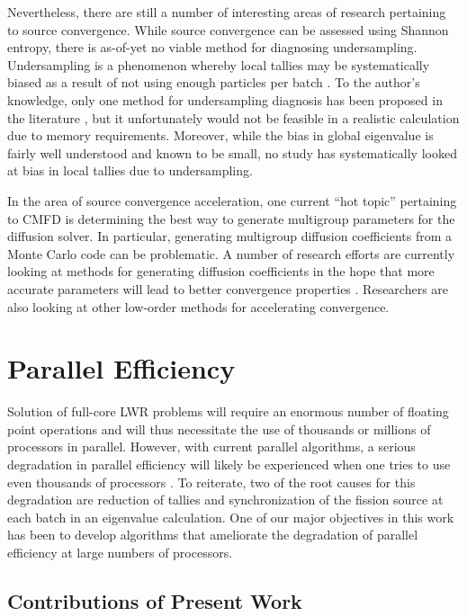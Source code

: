 Nevertheless, there are still a number of interesting areas of research
pertaining to source convergence. While source convergence can be assessed using
Shannon entropy, there is as-of-yet no viable method for diagnosing
undersampling. Undersampling is a phenomenon whereby local tallies may be
systematically biased as a result of not using enough particles per batch
\cite{nse-ueki-2005, nse-ueki-2008}. To the author's knowledge, only one method
for undersampling diagnosis has been proposed in the literature
\cite{jnst-ueki-2011}, but it unfortunately would not be feasible in a realistic
calculation due to memory requirements. Moreover, while the bias in global
eigenvalue is fairly well understood \cite{ane-brissenden-1986} and known to be
small, no study has systematically looked at bias in local tallies due to
undersampling.

In the area of source convergence acceleration, one current ``hot topic''
pertaining to CMFD is determining the best way to generate multigroup parameters
for the diffusion solver. In particular, generating multigroup diffusion
coefficients from a Monte Carlo code can be problematic. A number of research
efforts are currently looking at methods for generating diffusion coefficients
in the hope that more accurate parameters will lead to better convergence
properties \cite{ane-fridman-2011, nse-pounders-2009}. Researchers are also
looking at other low-order methods for accelerating convergence.

\section{Parallel Efficiency}

Solution of full-core LWR problems will require an enormous number of floating
point operations and will thus necessitate the use of thousands or millions of
processors in parallel. However, with current parallel algorithms, a serious
degradation in parallel efficiency will likely be experienced when one tries to
use even thousands of processors \cite{physor-hoogenboom-2012}. To reiterate,
two of the root causes for this degradation are reduction of tallies and
synchronization of the fission source at each batch in an eigenvalue
calculation. One of our major objectives in this work has been to develop
algorithms that ameliorate the degradation of parallel efficiency at large
numbers of processors.

\subsection{Contributions of Present Work}

